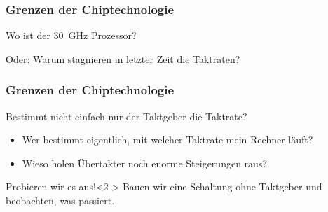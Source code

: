\begin{frame}
	\frametitle{Grenzen der Chiptechnologie}
	\begin{alertblock}{Wo ist der \SI[detect-weight]{30}{\giga\hertz} Prozessor?}

		Oder: Warum stagnieren in letzter Zeit die Taktraten?

	\end{alertblock}
\end{frame}

\begin{frame}
	\frametitle{Grenzen der Chiptechnologie}

	\begin{block}{Bestimmt nicht einfach nur der Taktgeber die Taktrate?}
		\begin{itemize}
			\item Wer bestimmt eigentlich, mit welcher Taktrate mein Rechner läuft?
			\item Wieso holen Übertakter noch enorme Steigerungen raus?
		\end{itemize}
	\end{block}

	\begin{exampleblock}{Probieren wir es aus!}<2->
		Bauen wir eine Schaltung ohne Taktgeber und beobachten, was passiert.
	\end{exampleblock}
\end{frame}


